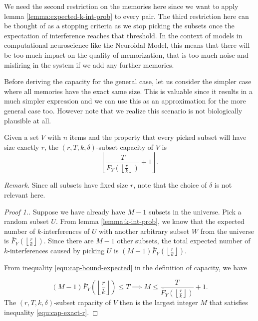     We need the second restriction on the memories here since we want to apply lemma \ref{lemma:expected-k-int-prob} to every pair. The third restriction here can be thought of as a stopping criteria as we stop picking the subsets once the expectation of interference reaches that threshold. In the context of models in computational neuroscience like the Neuroidal Model, this means that there will be too much impact on the quality of memorization, that is too much noise and misfiring in the system if we add any further memories.
    
    Before deriving the capacity for the general case, let us consider the simpler case where all memories have the exact same size. This is valuable since it results in a much simpler expression and we can use this as an approximation for the more general case too. However note that we realize this scenario is not biologically plausible at all. 

    \begin{theorem}
        \label{thm:exact-r}
        Given a set $V$ with $n$ items and the property that every picked subset will have size exactly $r$, the $(r,T,k,\delta)$-subset capacity of $V$ is 
        \begin{equation*}
            \left\lfloor \frac{T}{\bar{F}_Y\left(\left\lfloor \frac{r}{k} \right\rfloor\right)} + 1 \right\rfloor.
        \end{equation*}
    \end{theorem}

    \textit{Remark.} Since all subsets have fixed size $r$, note that the choice of $\delta$ is not relevant here.

    \begin{proof}[Proof 1.]
         Suppose we have already have $M-1$ subsets in the universe. Pick a random subset $U$. From lemma \ref{lemma:k-int-prob}, we know that the expected number of $k$-interferences of $U$  with another arbitrary subset $W$ from the universe is $\bar{F}_Y\left(\left\lfloor \frac{r}{k} \right\rfloor\right)$. Since there are $M-1$ other subsets, the total expected number of $k$-interferences caused by picking $U$ is $(M-1) \bar{F}_Y\left(\left\lfloor \frac{r}{k} \right\rfloor\right)$.

        From inequality \ref{equ:cap-bound-expected} in the definition of capacity, we have 
        
            \begin{equation}
            \label{equ:cap-exact-r}
                (M-1) \bar{F}_Y\left(\left\lfloor \frac{r}{k} \right\rfloor\right) \le T \implies M \le \frac{T}{\bar{F}_Y\left(\left\lfloor \frac{r}{k} \right\rfloor\right)} + 1.
            \end{equation}
            The $(r,T,k,\delta)$-subset capacity of $V$ then is the largest integer $M$ that satisfies inequality \ref{equ:cap-exact-r}.
    \end{proof}

